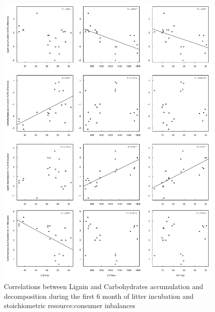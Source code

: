 \documentclass[authoryear,preprint,review,12pt]{elsarticle}
\begin{document}
\newpage
\begin{figure}[h!]
\vspace*{2mm}
\begin{center}
\includegraphics{sbb-graphcorr3}
\end{center}
\caption{Correlations between Lignin and Carbohydrates accumulation and decomposition during the first 6 month of litter incubation and stoichiometric resource:consumer inbalances}
\label{fig:cor3}
\end{figure}
\end{document}
